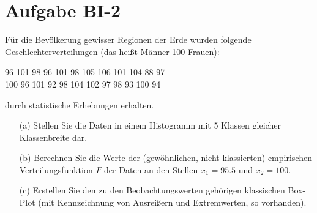 
\section{Aufgabe BI-2}

\begin{task}
    Für die Bevölkerung gewisser Regionen der Erde wurden folgende Geschlechterverteilungen (das heißt Männer 100 Frauen):
    \begin{tightcenter}
        96  101  98  96  101  98  105  106  101  104  88  97 \\
        100  96  101  92  98  104  102  97  98  93  100  94
    \end{tightcenter}
    durch statistische Erhebungen erhalten.

    \begin{enumerate}
        \item[(a)] Stellen Sie die Daten in einem Histogramm mit 5 Klassen gleicher Klassenbreite dar.
    \end{enumerate}
\end{task}

\begin{task}
    \begin{enumerate}
        \item[(b)] Berechnen Sie die Werte der (gewöhnlichen, nicht klassierten) empirischen Verteilungsfunktion $F$ der Daten an den Stellen $x_1=95.5$ und $x_2=100$.
    \end{enumerate}
\end{task}

\begin{task}
    \begin{enumerate}
        \item[(c)] Erstellen Sie den zu den Beobachtungswerten gehörigen klassischen Box-Plot (mit Kennzeichnung von Ausreißern und Extremwerten, so vorhanden).
    \end{enumerate}
\end{task}
